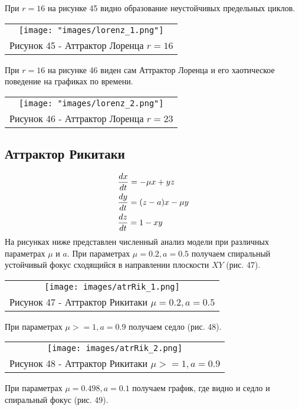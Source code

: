 При $r=16$ на рисунке 45 видно образование неустойчивых предельных циклов.
\begin{center}
  \begin{tabular}{c}
  \texttt{[image: "images/lorenz\_1.png"]}\\
  Рисунок 45 - Аттрактор Лоренца $r=16$
\end{tabular}
\end{center}
При $r=16$ на рисунке 46 виден сам Аттрактор Лоренца и его хаотическое поведение на графиках по времени.
\begin{center}
  \begin{tabular}{c}
  \texttt{[image: "images/lorenz\_2.png"]}\\
  Рисунок 46 - Аттрактор Лоренца $r=23$
\end{tabular}
\end{center}

\subsection{Аттрактор Рикитаки}
\begin{align}
  &\dfrac{d x}{dt} = -\mu x+yz \notag\\
  &\dfrac{d y}{dt} = (z-a)x-\mu y\\
  &\dfrac{d z}{dt} = 1-xy\notag
\end{align}
На рисунках ниже представлен численный анализ модели при различных параметрах $\mu$ и $a$.
При параметрах $\mu=0.2,a=0.5$ получаем спиральный устойчивый фокус сходящийся в направлении плоскости $XY$ (рис. 47).

\begin{center}
  \begin{tabular}{c}
  \texttt{[image: images/atrRik\_1.png]}\\
  Рисунок 47 - Аттрактор Рикитаки $\mu=0.2,a=0.5$
\end{tabular}
\end{center}

При параметрах $\mu>=1,a=0.9$ получаем седло (рис. 48).
\begin{center}
  \begin{tabular}{c}
  \texttt{[image: images/atrRik\_2.png]}\\
  Рисунок 48 - Аттрактор Рикитаки $\mu>=1,a=0.9$
\end{tabular}
\end{center}
При параметрах $\mu=0.498,a=0.1$ получаем график, где видно и седло и спиральный фокус (рис. 49).

